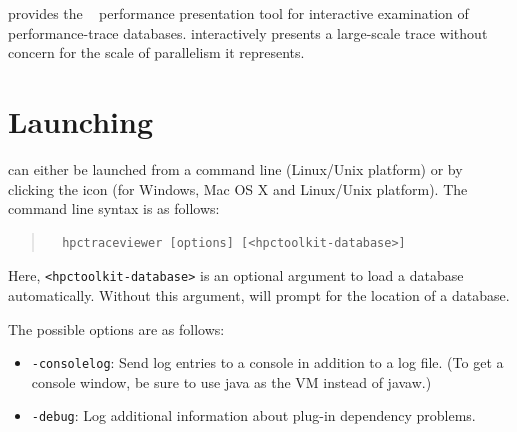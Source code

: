 


\newcommand{\traceview}{Trace view}
\newcommand{\depthview}{Depth view}
\newcommand{\miniview}{Mini map view}
\newcommand{\callview}{Call path view}





\HPCToolkit{} provides the \hpctraceviewer{}~\cite{Tallent-MC-etal:2011:hpctoolkit-scalable-tracing} performance presentation tool for interactive examination of performance-trace databases.
\hpctraceviewer{} interactively presents a large-scale trace without concern for the scale of parallelism it represents.



\section{Launching}

\hpctraceviewer{} can either be launched from a command line (Linux/Unix platform) or by clicking the \hpctraceviewer{} icon (for Windows, Mac OS X and Linux/Unix platform).
The command line syntax is as follows:
\begin{quote}
\begin{verbatim}
  hpctraceviewer [options] [<hpctoolkit-database>]
\end{verbatim}
\end{quote}
Here, \texttt{<hpctoolkit-database>} is an optional argument to load a database automatically.
Without this argument, \hpctraceviewer{} will prompt for the location of a database.

The possible options are as follows:
\begin{itemize}

 \item \texttt{-consolelog}: Send log entries to a console in addition to a log file.
   (To get a console window, be sure to use java as the VM instead of javaw.)

 \item \texttt{-debug}: Log additional information about plug-in dependency problems.
\end{itemize}


